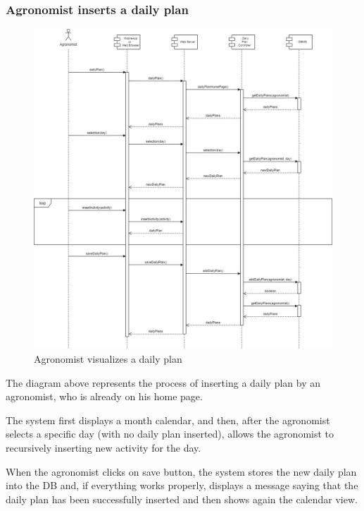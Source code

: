 \documentclass{article}
\begin{document}
    
    \newpage
    
    
    \subsubsection{Agronomist inserts a daily plan}
        \begin{figure} [h]
            \centering
            \includegraphics[width=1\textwidth]{images/ArchitecturalDesign/RuntimeView/10. AgronomistInsertDailyPlan.jpg}
            \caption{\label{fig:agronomistVisualizeDailyPlan}Agronomist visualizes a daily plan}
        \end{figure}
        
        The diagram above represents the process of inserting a daily plan by an agronomist, who is already on his home page. \par
        The system first displays a month calendar, and then, after the agronomist selects a specific day (with no daily plan inserted), allows the agronomist to recursively inserting new activity for the day. \par    
        When the agronomist clicks on save button, the system stores the new daily plan into the DB and, if everything works properly, displays a message saying that the daily plan has been successfully inserted and then shows again the calendar view. \par
        
\end{document}
